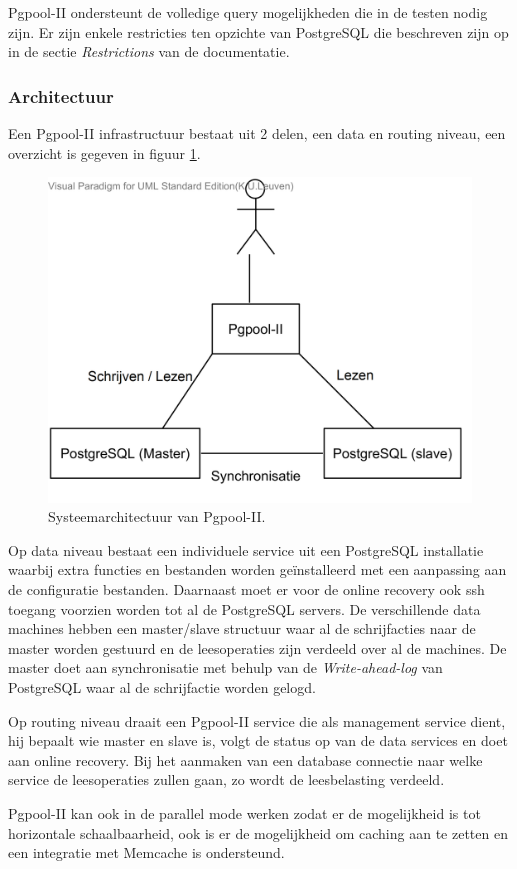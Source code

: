Pgpool-II ondersteunt de volledige query mogelijkheden die in de testen nodig zijn. Er zijn enkele restricties ten opzichte van PostgreSQL die beschreven zijn op in de sectie \textit{Restrictions} van de documentatie\cite{pgpool-doc}. 

\subsubsection{Architectuur}
Een Pgpool-II infrastructuur bestaat uit 2 delen, een data en routing niveau, een overzicht is gegeven in figuur \ref{fig:Pgpool-structure}. 

\begin{figure}[ht!]
\centering
\includegraphics[width=0.5\linewidth]{img/Pgpool-structuur}
\caption{Systeemarchitectuur van Pgpool-II.}
\label{fig:Pgpool-structure}
\end{figure}

Op data niveau bestaat een individuele service uit een PostgreSQL installatie waarbij extra functies en bestanden worden geïnstalleerd met een aanpassing aan de configuratie bestanden.  Daarnaast moet er voor de online recovery ook ssh toegang voorzien worden tot al de PostgreSQL servers. De verschillende data machines hebben een master/slave structuur waar al de schrijfacties naar de master worden gestuurd en de leesoperaties zijn verdeeld over al de machines. De master doet aan synchronisatie met behulp van de \textit{Write-ahead-log} van PostgreSQL waar al de schrijfactie worden gelogd. 

Op routing niveau draait een Pgpool-II service die als management service dient, hij bepaalt wie master en slave is, volgt de status op van de data services en doet aan online recovery. Bij het aanmaken van een database connectie naar welke service de leesoperaties zullen gaan, zo wordt de leesbelasting verdeeld. 

Pgpool-II kan ook in de parallel mode werken zodat er de mogelijkheid is tot horizontale schaalbaarheid, ook is er de mogelijkheid om caching aan te zetten en een integratie met Memcache is ondersteund. 

